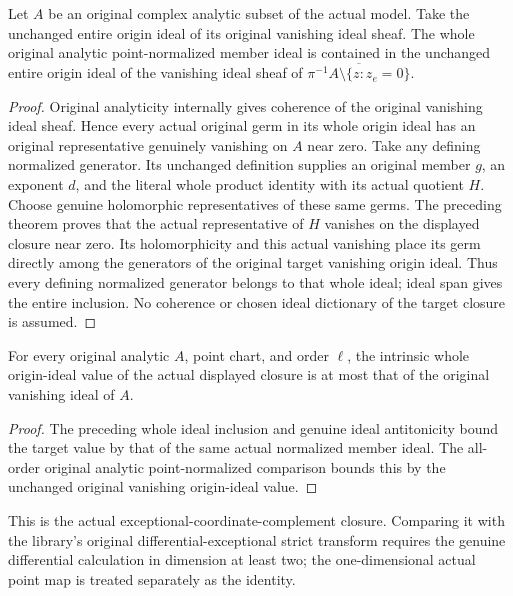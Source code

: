 \begin{theorem}
\label{hir:actual-point-whole-normalized-ideal-closure-vanishing}
\leanok
Let $A$ be an original complex analytic subset of the actual model. Take
the unchanged entire origin ideal of its original vanishing ideal sheaf.
The whole original analytic point-normalized member ideal is contained
in the unchanged entire origin ideal of the vanishing ideal sheaf of
$\overline{\pi^{-1}A\setminus\{z:z_e=0\}}$.
\end{theorem}
\begin{proof}
Original analyticity internally gives coherence of the original vanishing
ideal sheaf. Hence every actual original germ in its whole origin ideal
has an original representative genuinely vanishing on $A$ near zero.
Take any defining normalized generator. Its unchanged definition supplies
an original member $g$, an exponent $d$, and the literal whole product
identity with its actual quotient $H$. Choose genuine holomorphic
representatives of these same germs. The preceding theorem proves that
the actual representative of $H$ vanishes on the displayed closure near
zero. Its holomorphicity and this actual vanishing place its germ directly
among the generators of the original target vanishing origin ideal.
Thus every defining normalized generator belongs to that whole ideal;
ideal span gives the entire inclusion. No coherence or chosen ideal
dictionary of the target closure is assumed.
\end{proof}

\begin{corollary}
\label{hir:actual-point-exceptional-complement-closure-all-hs}
\leanok
For every original analytic $A$, point chart, and order $\ell$, the
intrinsic whole origin-ideal value of the actual displayed closure is
at most that of the original vanishing ideal of $A$.
\end{corollary}
\begin{proof}
The preceding whole ideal inclusion and genuine ideal antitonicity bound
the target value by that of the same actual normalized member ideal.
The all-order original analytic point-normalized comparison bounds this
by the unchanged original vanishing origin-ideal value.
\end{proof}

This is the actual exceptional-coordinate-complement closure. Comparing
it with the library's original differential-exceptional strict transform
requires the genuine differential calculation in dimension at least two;
the one-dimensional actual point map is treated separately as the identity.
